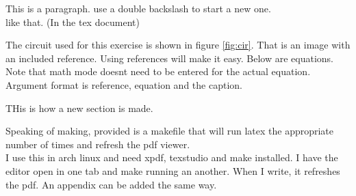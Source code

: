 \def \name 		{Chris Culpepper (Computer Engineering)}
\def \labnum	{\#4}
\def \tonames   {Tyler Nicholson}
\def \disptitle	{MOSFET Differential Pair with Active Load}
\def \datestart	{04-03-2015}
\def \dateend	{04-17-2015}





This is a paragraph. use a double backslash to start a new one. \\
like that. (In the tex document)

The circuit used for this exercise is shown in figure \ref{fig:cir}. 
That is an image with an included reference. Using references will make it easy.
Below are equations. Note that math mode doesnt need to be entered for the actual equation. 
Argument format is reference, equation and the caption. 
	
THis is how a new section is made. 

Speaking of making, provided is a makefile that will run latex the appropriate number of times and refresh the pdf viewer. 
\\
I use this in arch linux and need xpdf, texstudio and make installed. I have the editor open in one tab and make running an another. When I write, it refreshes the pdf. 
An appendix can be added the same way. 


